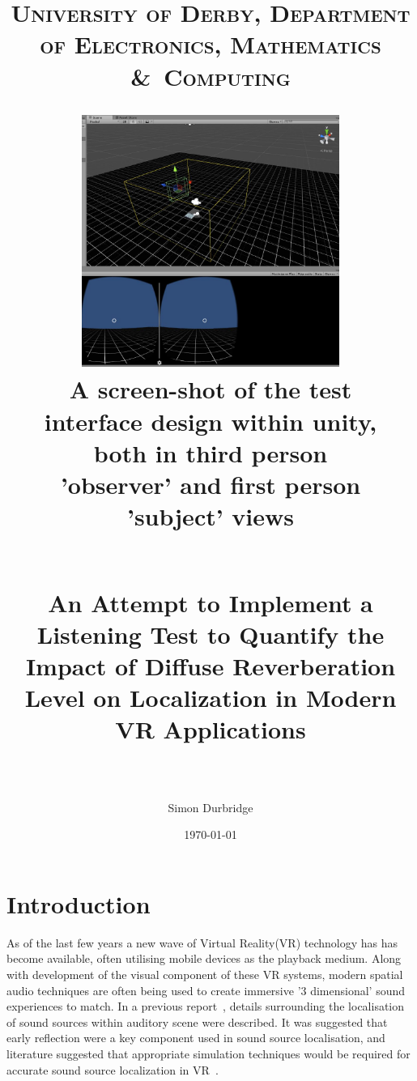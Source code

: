 \documentclass[paper=a4, fontsize=10pt, font=arial]{scrartcl} %
\title{	
\normalfont \normalsize 
\textsc{University of Derby, Department of Electronics, Mathematics \&\ Computing} \\ [25pt] %
\begin{figure}[H]
\centering
\includegraphics[width=0.75\textwidth]{overview_unity.jpg}
\centering
\caption{A screen-shot of the test interface design within unity, both in third person 'observer' and first person 'subject' views}
\end{figure}
\horrule{0.5pt} \\[0.4cm] %
\huge An Attempt to Implement a Listening Test to Quantify the Impact of Diffuse Reverberation Level on Localization in Modern VR Applications \\ %
\horrule{2pt} \\[0.5cm] %
}
\author{Simon Durbridge} %
\date{\normalsize\today} %
\numberwithin{equation}{section} %
\numberwithin{figure}{section} %
\numberwithin{table}{section} %
\begin{document}
\maketitle %


\tableofcontents

\newpage


\listoffigures

\newpage





\section{Introduction}

As of the last few years a new wave of Virtual Reality(VR) technology has has become available, often utilising mobile devices as the playback medium. Along with development of the visual component of these VR systems, modern spatial audio techniques are often being used to create immersive '3 dimensional' sound experiences to match.
In a previous report~\cite{Durbridge2016b}, details surrounding the localisation of sound sources within auditory scene were described. It was suggested that early reflection were a key component used in sound source localisation, and literature suggested that appropriate simulation techniques would be required for accurate sound source localization in VR~\cite{Begault1995}. 
\end{document}
